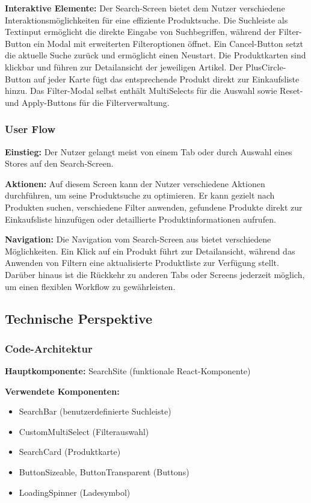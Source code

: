 \noindent\textbf{Interaktive Elemente:}
Der Search-Screen bietet dem Nutzer verschiedene Interaktionsmöglichkeiten für eine effiziente Produktsuche. Die Suchleiste als Textinput ermöglicht die direkte Eingabe von Suchbegriffen, während der Filter-Button ein Modal mit erweiterten Filteroptionen öffnet. Ein Cancel-Button setzt die aktuelle Suche zurück und ermöglicht einen Neustart. Die Produktkarten sind klickbar und führen zur Detailansicht der jeweiligen Artikel. Der PlusCircle-Button auf jeder Karte fügt das entsprechende Produkt direkt zur Einkaufsliste hinzu. Das Filter-Modal selbst enthält MultiSelects für die Auswahl sowie Reset- und Apply-Buttons für die Filterverwaltung.

\subsubsection{User Flow}
\textbf{Einstieg:} Der Nutzer gelangt meist von einem Tab oder durch Auswahl eines Stores auf den Search-Screen.

\noindent\textbf{Aktionen:} Auf diesem Screen kann der Nutzer verschiedene Aktionen durchführen, um seine Produktsuche zu optimieren. Er kann gezielt nach Produkten suchen, verschiedene Filter anwenden, gefundene Produkte direkt zur Einkaufsliste hinzufügen oder detaillierte Produktinformationen aufrufen.

\noindent\textbf{Navigation:}
Die Navigation vom Search-Screen aus bietet verschiedene Möglichkeiten. Ein Klick auf ein Produkt führt zur Detailansicht, während das Anwenden von Filtern eine aktualisierte Produktliste zur Verfügung stellt. Darüber hinaus ist die Rückkehr zu anderen Tabs oder Screens jederzeit möglich, um einen flexiblen Workflow zu gewährleisten.

\subsection{Technische Perspektive}

\subsubsection{Code-Architektur}

\textbf{Hauptkomponente:} SearchSite (funktionale React-Komponente)

\noindent\textbf{Verwendete Komponenten:}
\begin{itemize}
    \item SearchBar (benutzerdefinierte Suchleiste)
    \item CustomMultiSelect (Filterauswahl)
    \item SearchCard (Produktkarte)
    \item ButtonSizeable, ButtonTransparent (Buttons)
    \item LoadingSpinner (Ladesymbol)
\end{itemize}

